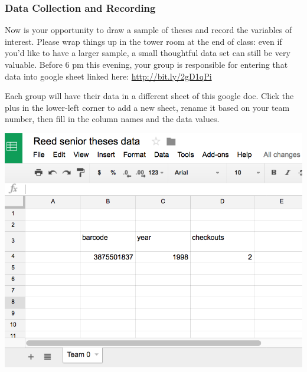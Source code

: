 \documentclass[10pt]{article}\usepackage[]{graphicx}\usepackage[]{color}
\begin{document}
\vspace{100mm}

\subsubsection*{Data Collection and Recording}
Now is your opportunity to draw a sample of theses and record the variables of interest. Please wrap things up in the tower room at the end of class: even if you'd like to have a larger sample, a small thoughtful data set can still be very valuable. Before 6 pm this evening, your group is responsible for entering that data into google sheet linked here: \url{http://bit.ly/2gD1qPi}

Each group will have their data in a different sheet of this google doc. Click the plus in the lower-left corner to add a new sheet, rename it based on your team number, then fill in the column names and the data values.

\vspace{10mm}

\includegraphics[scale=.5]{senior-thesis-sheets.png}
\end{document}
